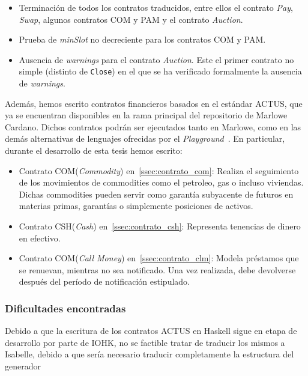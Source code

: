 \documentclass[12pt]{book}
\begin{document}
\begin{itemize}
    \item Terminación de todos los contratos traducidos, entre ellos el contrato \textit{Pay}, \textit{Swap}, algunos contratos COM y PAM y el contrato \textit{Auction}.
    \item Prueba de \textit{minSlot} no decreciente para los contratos COM y PAM.\@
    \item Ausencia de \textit{warnings} para el contrato \textit{Auction}. Este el primer contrato no simple (distinto de \texttt{Close}) en el que se ha verificado formalmente la ausencia de \textit{warnings}.
\end{itemize}

Además, hemos escrito contratos financieros basados en el estándar ACTUS, que ya se encuentran disponibles en la rama principal del repositorio de Marlowe Cardano. Dichos contratos podrán ser ejecutados tanto en Marlowe, como en las demás alternativas de lenguajes ofrecidas por el \textit{Playground}~\cite{marlowe_playground}. En particular, durante el desarrollo de esta tesis hemos escrito:

\begin{itemize}
    \item Contrato COM(\textit{Commodity}) en~\ref{ssec:contrato_com}: Realiza el seguimiento de los movimientos de commodities como el petroleo, gas o incluso viviendas. Dichas commodities pueden servir como garantía subyacente de futuros en materias primas, garantías o simplemente posiciones de activos.
    \item Contrato CSH(\textit{Cash}) en~\ref{ssec:contrato_csh}: Representa tenencias de dinero en efectivo.
    \item Contrato COM(\textit{Call Money}) en~\ref{ssec:contrato_clm}: Modela préstamos que se renuevan, mientras no sea notificado. Una vez realizada, debe devolverse después del período de notificación estipulado.
\end{itemize}

\subsubsection{Dificultades encontradas}

Debido a que la escritura de los contratos ACTUS en Haskell sigue en etapa de desarrollo por parte de IOHK, no se factible tratar de traducir los mismos a Isabelle, debido a que sería necesario traducir completamente la estructura del generador
\end{document}
